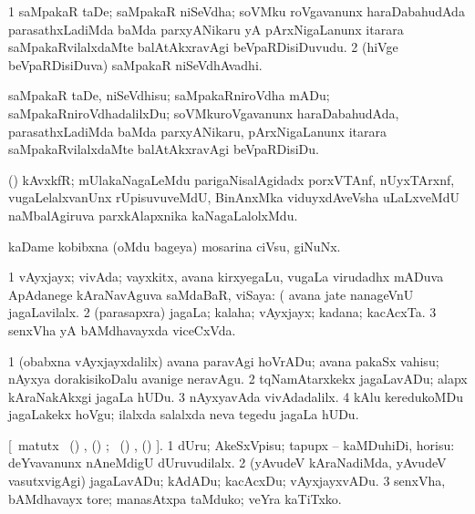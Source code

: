 \bentry
{}
\gl{\nA}
\bmng
\bnum
\num{1} saMpakaR taDe; saMpakaR niSeVdha; soVMku roVgavanunx haraDabahudAda parasathxLadiMda baMda parxyANikaru yA pArxNigaLanunx itarara saMpakaRvilalxdaMte balAtAkxravAgi beVpaRDisiDuvudu. 
\num{2} (hiVge beVpaRDisiDuva) saMpakaR niSeVdhAvadhi. 
\enum
\emng
\eentry

\bentry
{}
\gl{\sakirx}
\bmng
saMpakaR taDe, niSeVdhisu; saMpakaRniroVdha mADu; saMpakaRniroVdhadalilxDu; soVMkuroVgavanunx haraDabahudAda, parasathxLadiMda baMda parxyANikaru, pArxNigaLanunx itarara saMpakaRvilalxdaMte balAtAkxravAgi beVpaRDisiDu. 
\emng
\eentry

\bentry
{}
\gl{\nA}
\bmng
(\Bwvi) kAvxkfR; mUlakaNagaLeMdu parigaNisalAgidadx porxVTAnf, nUyxTArxnf, \mo vugaLelalxvanUnx rUpisuvuveMdU, BinAnxMka viduyxdAveVsha uLaLxveMdU naMbalAgiruva parxkAlapxnika kaNagaLalolxMdu. 
\emng
\eentry

\bentry
{}
\gl{\nA}
\bmng
kaDame kobibxna (oMdu bageya) mosarina ciVsu, giNuNx. 
\emng
\eentry

\bentry
{}
\gl{\nA}
\bmng
\bnum
\num{1} vAyxjayx; vivAda; vayxkitx, avana kirxyegaLu, \mo vugaLa virudadhx mADuva ApAdanege kAraNavAguva saMdaBaR, viSaya:  (  avana jate nanageVnU jagaLavilalx. 
\num{2} (parasapxra) jagaLa; kalaha; vAyxjayx; kadana; kacAcxTa. 
\num{3} senxVha yA bAMdhavayxda viceCxVda. 
\enum
\emng

\noindent
\gl{\pagu}
\bmng
\bnum
\num{1}   (obabxna vAyxjayxdalilx) avana paravAgi hoVrADu; avana pakaSx vahisu; nAyxya dorakisikoDalu avanige neravAgu. 
\num{2}    tqNamAtarxkekx jagaLavADu; alapx kAraNakAkxgi jagaLa hUDu. 
\num{3}   nAyxyavAda vivAdadalilx. 
\num{4}    kAlu keredukoMDu jagaLakekx hoVgu; ilalxda salalxda neva tegedu jagaLa hUDu. 
\enum
\emng
\eentry

\bentry
{}
\gl{\akirx}
[\BU\ matutx \BUkaq\ (\birx) , (\ame) ; 
\vakaq\ (\birx) , (\ame) ].\bmng
\bnum
\num{1} dUru; AkeSxVpisu; tapupx -- kaMDuhiDi, horisu:    deYvavanunx nAneMdigU dUruvudilalx. 
\num{2} (yAvudeV kAraNadiMda, yAvudeV vasutxvigAgi) jagaLavADu; kAdADu; kacAcxDu; vAyxjayxvADu. 
\num{3} senxVha, bAMdhavayx tore; manasAtxpa taMduko; veYra kaTiTxko. 
\enum
\emng
\eentry

